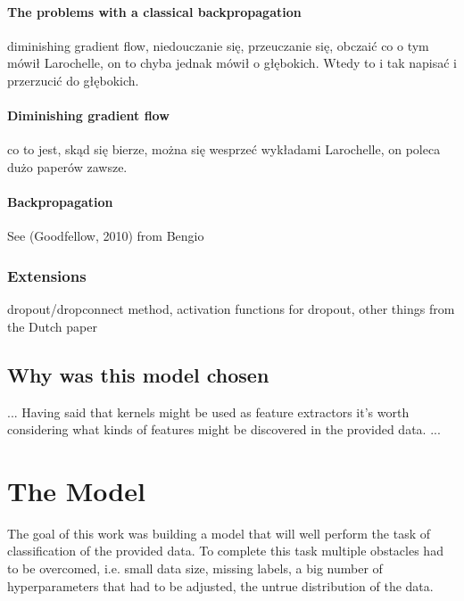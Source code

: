 \documentclass[a4paper,10pt]{report}
\begin{document}
	\subsubsection{The problems with a classical backpropagation} %
	  diminishing gradient flow, niedouczanie się, przeuczanie się, obczaić co o tym mówił Larochelle, on to chyba jednak mówił o głębokich. Wtedy to i tak napisać i przerzucić do głębokich.
	
	\subsubsection{Diminishing gradient flow} %
	  co to jest, skąd się bierze, można się wesprzeć wykładami Larochelle, on poleca dużo paperów zawsze.
	  
	\subsubsection{Backpropagation} %
	  See (Goodfellow, 2010) from Bengio
	
      \subsection{Extensions} %
	dropout/dropconnect method, activation functions for dropout, other things from the Dutch paper
	
	
    \section{Why was this model chosen}
	... Having said that kernels might be used as feature extractors it's worth considering what kinds of features might be discovered in the provided data. ...
	
  \chapter{The Model} %
      The goal of this work was building a model that will well perform the task of classification of the provided data. To complete this task multiple obstacles had to be overcomed, i.e. small data size, missing labels, a big number of hyperparameters that had to be adjusted, the untrue distribution of the data.
      
\end{document}
